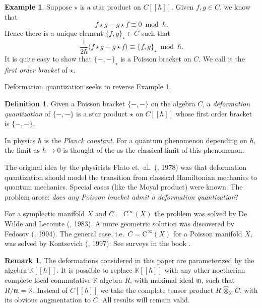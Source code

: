 \documentclass{conm-p-l}
\theoremstyle{definition}
\newtheorem{dfn}[equation]{Definition}
\newtheorem{rem}[equation]{Remark}
\newtheorem{exa}[equation]{Example}
\numberwithin{equation}{section}
\newcommand{\opn}{\operatorname}
\newcommand{\mfrak}[1]{\mathfrak{#1}}
\newcommand{\mrm}[1]{\mathrm{#1}}
\newcommand{\mbb}[1]{\mathbb{#1}}
\newcommand{\what}{\widehat}
\newcommand{\K}{\mbb{K}}
\newcommand{\m}{\mfrak{m}}
\newcommand{\smfrac}[2]{\textstyle \frac{#1}{#2}}
\newcommand{\hatotimes}[1]{\, \what{\otimes}_{#1} \,}
\begin{document}
\begin{exa} \label{exa3}
Suppose $\star$ is a star product on  $C[[\hbar]]$. Given $f, g \in C$, we know
that 
\[ f \star g - g \star f \equiv 0 \ \opn{mod}\ \hbar . \]
Hence there is a unique element 
$\{ f, g \}_{\star} \in C$
such that 
\[ \smfrac{1}{2 \hbar} \bigl( f \star g - g \star f \bigr)
\equiv \{ f, g \}_{\star}  \ \opn{mod}\ \hbar . \]
It is quite easy to show that $\{ -,- \}_{\star}$ is a Poisson
bracket on $C$. We call it the {\em first order bracket}
of $\star$. 
\end{exa}

Deformation quantization seeks to reverse Example \ref{exa3}.

\begin{dfn}
Given a Poisson bracket $\{ -,- \}$ on the algebra $C$, a 
{\em deformation quantization} of $\{ -,- \}$ is a star product $\star$ on
$C[[\hbar]]$ whose first order bracket is $\{ -,- \}$.
\end{dfn}

In physics $\hbar$ is the {\em Planck constant}. For a
quantum
phenomenon depending on $\hbar$, the limit as $\hbar \to 0$ is thought
of the as the classical limit of this phenomenon.

The original idea by the physicists Flato et.\ al.\ (\cite{BFFLS},
1978) was that deformation quantization should model the transition
from classical Hamiltonian mechanics to quantum mechanics.
Special cases (like the Moyal product) were known. The problem 
arose: {\em does any Poisson bracket admit a 
deformation quantization}?

For a symplectic manifold $X$ and $C = \mrm{C}^{\infty}(X)$ 
the problem was solved by De Wilde and Lecomte  (\cite{DL}, 1983). 
A more geometric solution was discovered by Fedosov (\cite{Fe},
1994). The general case, i.e.\ $C = \mrm{C}^{\infty}(X)$ for a 
Poisson manifold $X$, was solved by Kontsevich  (\cite{Ko1}, 1997).
See surveys in the book \cite{CKTB}.

\begin{rem} \label{rem:parameter}
The deformations considered in this paper are parameterized by the algebra 
$\K[[\hbar]]$. It is possible to replace $\K[[\hbar]]$ with any other noetherian
complete local commutative $\K$-algebra $R$, with maximal ideal $\m$, such that
$R / \m = \K$. Instead of $C[[\hbar]]$ we take the complete tensor product 
$R \hatotimes{\K} C$, with its obvious augmentation to $C$.
All results will remain valid. 
\end{rem}
\end{document}
